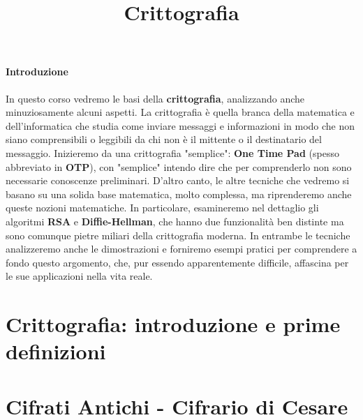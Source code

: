 \documentclass{rapport}
\title{Crittografia} %
\begin{document}

\subject{Sistemi e Reti} %



        
\buildmargins %
\buildcover %
\toc %



\paragraph{Introduzione}
In questo corso vedremo le basi della \textbf{crittografia}, analizzando anche minuziosamente alcuni aspetti. La crittografia è quella branca della matematica e dell'informatica che studia come inviare messaggi e informazioni in modo che non siano comprensibili o leggibili da chi non è il mittente o il destinatario del messaggio. Inizieremo da una crittografia "semplice": \textbf{One Time Pad} (spesso abbreviato in \textbf{OTP}), con "semplice" intendo dire che per comprenderlo non sono necessarie conoscenze preliminari. D'altro canto, le altre tecniche che vedremo si basano su una solida base matematica, molto complessa, ma riprenderemo anche queste nozioni matematiche. In particolare, esamineremo nel dettaglio gli algoritmi \textbf{RSA} e \textbf{Diffie-Hellman}, che hanno due funzionalità ben distinte ma sono comunque pietre miliari della crittografia moderna. In entrambe le tecniche analizzeremo anche le dimostrazioni e forniremo esempi pratici per comprendere a fondo questo argomento, che, pur essendo apparentemente difficile, affascina per le sue applicazioni nella vita reale.

\section{Crittografia: introduzione e prime definizioni}


\section{Cifrati Antichi - Cifrario di Cesare}
\end{document}
